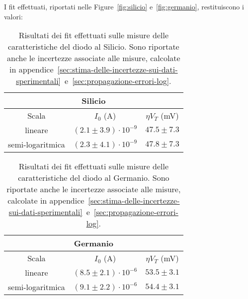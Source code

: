 \documentclass[@SRC@/main]{subfiles}
\begin{document}
    \noindent I fit effettuati, riportati nelle Figure~\ref{fig:silicio} e~\ref{fig:germanio}, restituiscono i valori:
    \vspace{0.2cm}
    \begin{table}[ht]
      \centering
      \begin{tabular}{||c|c|c||}
        \hline
        \multicolumn{3}{||c||}{Silicio} \\
        \hline
        Scala            & $I_0$ (\textnormal{A})       & $\eta V_T$ (\textnormal{mV}) \\
        \hline
        lineare          & $(2.1\pm3.9)\cdot 10^{-9}$   & $47.5\pm7.3$                 \\
        \hline
        semi-logaritmica & $(2.3 \pm 4.1)\cdot 10^{-9}$ & $47.8\pm 7.3$                \\
        \hline
      \end{tabular}
      \caption{Risultati dei fit effettuati sulle misure delle caratteristiche del diodo
      al Silicio. Sono riportate anche le incertezze associate alle misure, calcolate in
      appendice~\ref{sec:stima-delle-incertezze-sui-dati-sperimentali}~e~\ref{sec:propagazione-errori-log}.}
      \label{tab:fit-silicio}
    \end{table}

    \begin{table}[ht]
      \centering
      \begin{tabular}{||c|c|c||}
        \hline
        \multicolumn{3}{||c||}{Germanio} \\
        \hline
        Scala            & $I_0$ (\textnormal{A})       & $\eta V_T $ (\textnormal{mV}) \\
        \hline
        lineare          & $(8.5\pm2.1) \cdot 10^{-6}$  & $53.5\pm3.1$                  \\
        \hline
        semi-logaritmica & $(9.1\pm 2.2) \cdot 10^{-6}$ & $54.4\pm3.1$                  \\
        \hline
      \end{tabular}
      \caption{Risultati dei fit effettuati sulle misure delle caratteristiche del diodo
      al Germanio. Sono riportate anche le incertezze associate alle misure, calcolate in
      appendice~\ref{sec:stima-delle-incertezze-sui-dati-sperimentali}~e~\ref{sec:propagazione-errori-log}.}
      \label{tab:fit-germanio}
    \end{table}

\end{document}
